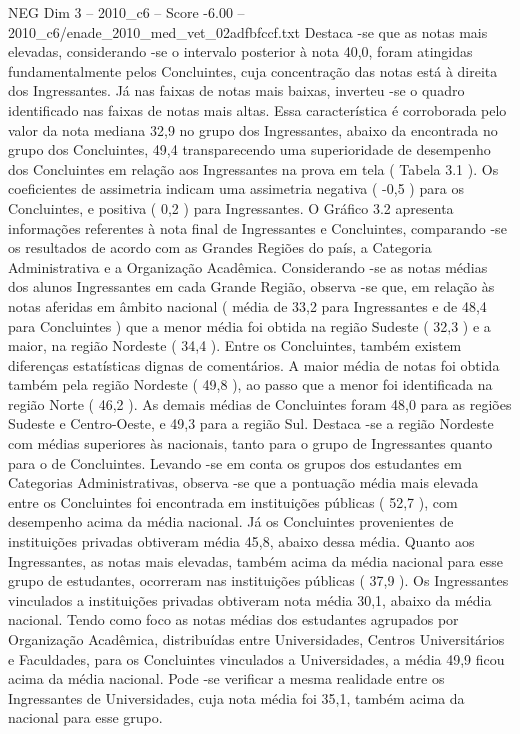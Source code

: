 \begin{textsample}{NEG Dim 3 – 2010\_c6 – Score -6.00 – 2010\_c6/enade\_2010\_med\_vet\_02adfbfccf.txt}
Destaca -se que as notas mais elevadas, considerando -se o intervalo posterior à nota 40,0, foram atingidas fundamentalmente pelos Concluintes, cuja concentração das notas está à direita dos Ingressantes.
Já nas faixas de notas mais baixas, inverteu -se o quadro identificado nas faixas de notas mais altas.
Essa característica é corroborada pelo valor da nota mediana 32,9 no grupo dos Ingressantes, abaixo da encontrada no grupo dos Concluintes, 49,4 transparecendo uma superioridade de desempenho dos Concluintes em relação aos Ingressantes na prova em tela ( Tabela 3.1 ).
Os coeficientes de assimetria indicam uma assimetria negativa ( -0,5 ) para os Concluintes, e positiva ( 0,2 ) para Ingressantes.
O Gráfico 3.2 apresenta informações referentes à nota final de Ingressantes e Concluintes, comparando -se os resultados de acordo com as Grandes Regiões do país, a Categoria Administrativa e a Organização Acadêmica.
Considerando -se as notas médias dos alunos Ingressantes em cada Grande Região, observa -se que, em relação às notas aferidas em âmbito nacional ( média de 33,2 para Ingressantes e de 48,4 para Concluintes ) que a menor média foi obtida na região Sudeste ( 32,3 ) e a maior, na região Nordeste ( 34,4 ).
Entre os Concluintes, também existem diferenças estatísticas dignas de comentários.
A maior média de notas foi obtida também pela região Nordeste ( 49,8 ), ao passo que a menor foi identificada na região Norte ( 46,2 ).
As demais médias de Concluintes foram 48,0 para as regiões Sudeste e Centro-Oeste, e 49,3 para a região Sul.
Destaca -se a região Nordeste com médias superiores às nacionais, tanto para o grupo de Ingressantes quanto para o de Concluintes.
Levando -se em conta os grupos dos estudantes em Categorias Administrativas, observa -se que a pontuação média mais elevada entre os Concluintes foi encontrada em instituições públicas ( 52,7 ), com desempenho acima da média nacional.
Já os Concluintes provenientes de instituições privadas obtiveram média 45,8, abaixo dessa média.
Quanto aos Ingressantes, as notas mais elevadas, também acima da média nacional para esse grupo de estudantes, ocorreram nas instituições públicas ( 37,9 ).
Os Ingressantes vinculados a instituições privadas obtiveram nota média 30,1, abaixo da média nacional.
Tendo como foco as notas médias dos estudantes agrupados por Organização Acadêmica, distribuídas entre Universidades, Centros Universitários e Faculdades, para os Concluintes vinculados a Universidades, a média 49,9 ficou acima da média nacional.
Pode -se verificar a mesma realidade entre os Ingressantes de Universidades, cuja nota média foi 35,1, também acima da nacional para esse grupo.

\end{textsample}
